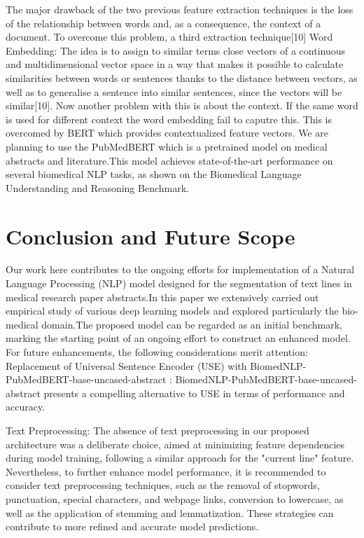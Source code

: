 \documentclass[conference]{IEEEtran}
\begin{document}
The major drawback of the two previous feature extraction techniques is the loss of the
relationship between words and, as a consequence, the context of a document. To overcome this problem,  a third extraction technique[10]
Word Embedding: The idea is to assign to similar terms close vectors of a continuous
and multidimensional vector space in a way that makes it possible to calculate similarities
between words or sentences thanks to the distance between vectors, as well as to
generalise a sentence into similar sentences, since the vectors will be similar[10].
Now another problem with this is about the context. If the same word is used for different context the word embedding fail to caputre this. 
This is overcomed by BERT which provides contextualized feature vectors.
We are planning to use the PubMedBERT which is a pretrained model on medical abstracts and literature.This model achieves state-of-the-art performance on several biomedical NLP tasks, as shown on the Biomedical Language Understanding and Reasoning Benchmark.      


\section{Conclusion and Future Scope}

Our work here contributes to the ongoing efforts for implementation of a Natural Language Processing (NLP) model designed for the segmentation of text lines in medical research paper abstracts.In this paper we extensively carried out empirical study of various deep learning models and explored particularly the bio-medical domain.The proposed model can be regarded as an initial benchmark, marking the starting point of an ongoing effort to construct an enhanced model.
For future enhancements, the following considerations merit attention:
Replacement of Universal Sentence Encoder (USE) with BiomedNLP-PubMedBERT-base-uncased-abstract : BiomedNLP-PubMedBERT-base-uncased-abstract presents a compelling alternative to USE in terms of performance and accuracy.

Text Preprocessing: The absence of text preprocessing in our proposed architecture was a deliberate choice, aimed at minimizing feature dependencies during model training, following a similar approach for the "current line" feature. Nevertheless, to further enhance model performance, it is recommended to consider text preprocessing techniques, such as the removal of stopwords, punctuation, special characters, and webpage links, conversion to lowercase, as well as the application of stemming and lemmatization. These strategies can contribute to more refined and accurate model predictions.
\end{document}
